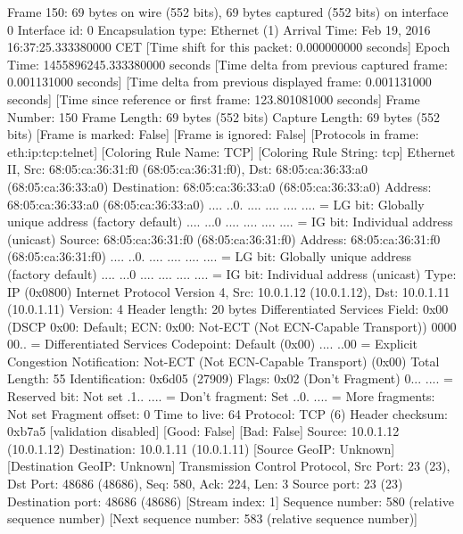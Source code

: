 Frame 150: 69 bytes on wire (552 bits), 69 bytes captured (552 bits) on interface 0
    Interface id: 0
    Encapsulation type: Ethernet (1)
    Arrival Time: Feb 19, 2016 16:37:25.333380000 CET
    [Time shift for this packet: 0.000000000 seconds]
    Epoch Time: 1455896245.333380000 seconds
    [Time delta from previous captured frame: 0.001131000 seconds]
    [Time delta from previous displayed frame: 0.001131000 seconds]
    [Time since reference or first frame: 123.801081000 seconds]
    Frame Number: 150
    Frame Length: 69 bytes (552 bits)
    Capture Length: 69 bytes (552 bits)
    [Frame is marked: False]
    [Frame is ignored: False]
    [Protocols in frame: eth:ip:tcp:telnet]
    [Coloring Rule Name: TCP]
    [Coloring Rule String: tcp]
Ethernet II, Src: 68:05:ca:36:31:f0 (68:05:ca:36:31:f0), Dst: 68:05:ca:36:33:a0 (68:05:ca:36:33:a0)
    Destination: 68:05:ca:36:33:a0 (68:05:ca:36:33:a0)
        Address: 68:05:ca:36:33:a0 (68:05:ca:36:33:a0)
        .... ..0. .... .... .... .... = LG bit: Globally unique address (factory default)
        .... ...0 .... .... .... .... = IG bit: Individual address (unicast)
    Source: 68:05:ca:36:31:f0 (68:05:ca:36:31:f0)
        Address: 68:05:ca:36:31:f0 (68:05:ca:36:31:f0)
        .... ..0. .... .... .... .... = LG bit: Globally unique address (factory default)
        .... ...0 .... .... .... .... = IG bit: Individual address (unicast)
    Type: IP (0x0800)
Internet Protocol Version 4, Src: 10.0.1.12 (10.0.1.12), Dst: 10.0.1.11 (10.0.1.11)
    Version: 4
    Header length: 20 bytes
    Differentiated Services Field: 0x00 (DSCP 0x00: Default; ECN: 0x00: Not-ECT (Not ECN-Capable Transport))
        0000 00.. = Differentiated Services Codepoint: Default (0x00)
        .... ..00 = Explicit Congestion Notification: Not-ECT (Not ECN-Capable Transport) (0x00)
    Total Length: 55
    Identification: 0x6d05 (27909)
    Flags: 0x02 (Don't Fragment)
        0... .... = Reserved bit: Not set
        .1.. .... = Don't fragment: Set
        ..0. .... = More fragments: Not set
    Fragment offset: 0
    Time to live: 64
    Protocol: TCP (6)
    Header checksum: 0xb7a5 [validation disabled]
        [Good: False]
        [Bad: False]
    Source: 10.0.1.12 (10.0.1.12)
    Destination: 10.0.1.11 (10.0.1.11)
    [Source GeoIP: Unknown]
    [Destination GeoIP: Unknown]
Transmission Control Protocol, Src Port: 23 (23), Dst Port: 48686 (48686), Seq: 580, Ack: 224, Len: 3
    Source port: 23 (23)
    Destination port: 48686 (48686)
    [Stream index: 1]
    Sequence number: 580    (relative sequence number)
    [Next sequence number: 583    (relative sequence number)]
